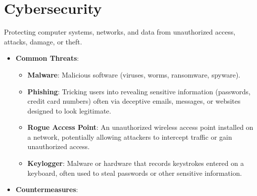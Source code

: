 \documentclass[11pt,oneside]{book}
\begin{document}
\section{Cybersecurity}
\label{sec:cybersecurity}
Protecting computer systems, networks, and data from unauthorized access, attacks, damage, or theft.
\begin{itemize}
    \item \textbf{Common Threats}:
        \begin{itemize}
            \item \textbf{Malware}: Malicious software (viruses, worms, ransomware, spyware).
            \item \textbf{Phishing}: Tricking users into revealing sensitive information (passwords, credit card numbers) often via deceptive emails, messages, or websites designed to look legitimate.
            \item \textbf{Rogue Access Point}: An unauthorized wireless access point installed on a network, potentially allowing attackers to intercept traffic or gain unauthorized access.
            \item \textbf{Keylogger}: Malware or hardware that records keystrokes entered on a keyboard, often used to steal passwords or other sensitive information.
        \end{itemize}
    \item \textbf{Countermeasures}:
        \begin{itemize}

\end{itemize}
\end{itemize}
\end{document}
